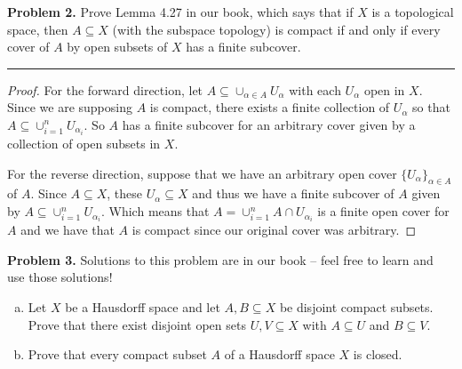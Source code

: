 \documentclass[leqno]{article}
\theoremstyle{nonumberplain}
\newtheorem{proof}{Proof}
\begin{document}


\noindent\textbf{Problem 2.} Prove Lemma 4.27 in our book, which says that if $X$ is a topological space, then $A\subseteq X$ (with the subspace topology) is compact if and only if every cover of $A$ by open subsets of $X$ has a finite subcover.


\noindent\rule[0.5ex]{\linewidth}{1pt}

\begin{proof}
For the forward direction, let $A\subseteq \cup_{\alpha \in A}{U_\alpha}$ with each $U_\alpha$ open in $X$.  Since we are supposing $A$ is compact, there exists a finite collection of $U_\alpha$ so that $A\subseteq \cup_{i=1}^n U_{\alpha_i}$.  So $A$ has a finite subcover for an arbitrary cover given by a collection of open subsets in $X$.

For the reverse direction, suppose that we have an arbitrary open cover $\{U_\alpha\}_{\alpha\in A}$ of $A$. Since $A\subseteq X$, these $U_\alpha \subseteq X$ and thus we have a finite subcover of $A$ given by $A\subseteq \cup_{i=1}^n U_{\alpha_i}$.  Which means that $A=\cup_{i=1}^n A\cap U_{\alpha_i}$ is a finite open cover for $A$ and we have that $A$ is compact since our original cover was arbitrary.
\end{proof}


\pagebreak




\noindent\textbf{Problem 3.} Solutions to this problem are in our book -- feel free to learn and use those solutions!
\begin{enumerate}[(a)]
\item Let $X$ be a Hausdorff space and let $A,B \subseteq X$ be disjoint compact subsets. Prove that there exist disjoint open sets $U,V \subseteq X$ with $A\subseteq U$ and $B\subseteq V$.
\item Prove that every compact subset $A$ of a Hausdorff space $X$ is closed.
\end{enumerate}
\end{document}
